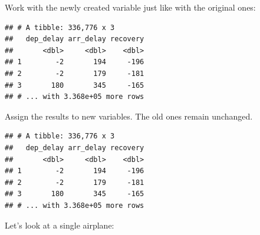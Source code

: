 \documentclass[]{book}
\newenvironment{Shaded}{}{}
\newcommand{\DataTypeTok}[1]{#1}
\newcommand{\KeywordTok}[1]{\textcolor[rgb]{0.00,0.00,1.00}{#1}}
\newcommand{\NormalTok}[1]{#1}
\newcommand{\OperatorTok}[1]{#1}
\newcommand{\StringTok}[1]{\textcolor[rgb]{0.00,0.50,0.50}{#1}}
\begin{document}
Work with the newly created variable just like with the original ones:

\begin{Shaded}
\end{Shaded}

\begin{verbatim}
## # A tibble: 336,776 x 3
##   dep_delay arr_delay recovery
##       <dbl>     <dbl>    <dbl>
## 1        -2       194     -196
## 2        -2       179     -181
## 3       180       345     -165
## # ... with 3.368e+05 more rows
\end{verbatim}

Assign the results to new variables.
The old ones remain unchanged.

\begin{Shaded}
\end{Shaded}

\begin{verbatim}
## # A tibble: 336,776 x 3
##   dep_delay arr_delay recovery
##       <dbl>     <dbl>    <dbl>
## 1        -2       194     -196
## 2        -2       179     -181
## 3       180       345     -165
## # ... with 3.368e+05 more rows
\end{verbatim}

Let's look at a single airplane:

\begin{Shaded}
\end{Shaded}
\end{document}

